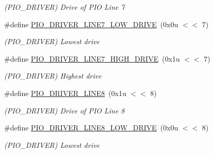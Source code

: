 \begin{DoxyCompactItemize}
\begin{DoxyCompactList}\small\item\em (P\+I\+O\+\_\+\+D\+R\+I\+V\+ER) Drive of P\+IO Line 7 \end{DoxyCompactList}\item 
\mbox{\label{group__SAMV71__PIO_ga093c02ecb8fa9199590b087ce7d2eabe}} 
\#define \mbox{\hyperlink{group__SAMV71__PIO_ga093c02ecb8fa9199590b087ce7d2eabe}{P\+I\+O\+\_\+\+D\+R\+I\+V\+E\+R\+\_\+\+L\+I\+N\+E7\+\_\+\+L\+O\+W\+\_\+\+D\+R\+I\+VE}}~(0x0u $<$$<$ 7)
\begin{DoxyCompactList}\small\item\em (P\+I\+O\+\_\+\+D\+R\+I\+V\+ER) Lowest drive \end{DoxyCompactList}\item 
\mbox{\label{group__SAMV71__PIO_ga90025136b0f5428c0054d88c20fe2830}} 
\#define \mbox{\hyperlink{group__SAMV71__PIO_ga90025136b0f5428c0054d88c20fe2830}{P\+I\+O\+\_\+\+D\+R\+I\+V\+E\+R\+\_\+\+L\+I\+N\+E7\+\_\+\+H\+I\+G\+H\+\_\+\+D\+R\+I\+VE}}~(0x1u $<$$<$ 7)
\begin{DoxyCompactList}\small\item\em (P\+I\+O\+\_\+\+D\+R\+I\+V\+ER) Highest drive \end{DoxyCompactList}\item 
\mbox{\label{group__SAMV71__PIO_gaa49e8999e47422be5b7195cc5e0c7834}} 
\#define \mbox{\hyperlink{group__SAMV71__PIO_gaa49e8999e47422be5b7195cc5e0c7834}{P\+I\+O\+\_\+\+D\+R\+I\+V\+E\+R\+\_\+\+L\+I\+N\+E8}}~(0x1u $<$$<$ 8)
\begin{DoxyCompactList}\small\item\em (P\+I\+O\+\_\+\+D\+R\+I\+V\+ER) Drive of P\+IO Line 8 \end{DoxyCompactList}\item 
\mbox{\label{group__SAMV71__PIO_ga320e4d7c712f795eb58de7c53d64287c}} 
\#define \mbox{\hyperlink{group__SAMV71__PIO_ga320e4d7c712f795eb58de7c53d64287c}{P\+I\+O\+\_\+\+D\+R\+I\+V\+E\+R\+\_\+\+L\+I\+N\+E8\+\_\+\+L\+O\+W\+\_\+\+D\+R\+I\+VE}}~(0x0u $<$$<$ 8)
\begin{DoxyCompactList}\small\item\em (P\+I\+O\+\_\+\+D\+R\+I\+V\+ER) Lowest drive \end{DoxyCompactList}\item 

\end{DoxyCompactItemize}
